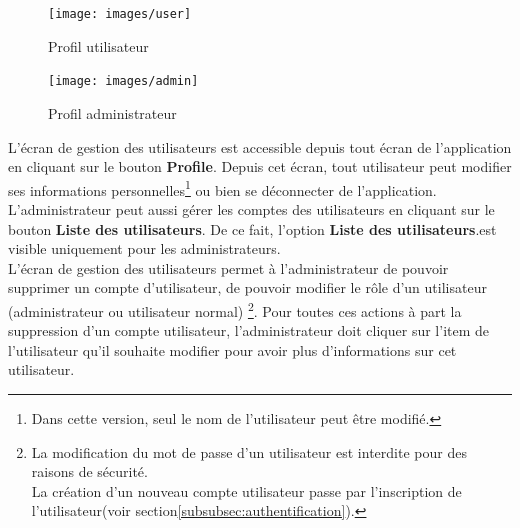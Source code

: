 \documentclass[12pt]{article}
\begin{document}
        \vspace{0.5cm}
        \begin{minipage}[t]{0.45\textwidth}
            \centering
            \begin{figure}[H]
                \centering
                \texttt{[image: images/user]}
                \caption{Profil utilisateur}
                \label{fig:gestion-utilisateurs-normal}
            \end{figure}
        \end{minipage}
        \hspace{0.5cm}
        \begin{minipage}[t]{0.45\textwidth}
            \centering
            \begin{figure}[H]
                \centering
                \texttt{[image: images/admin]}
                \caption{Profil administrateur}
                \label{fig:gestion-utilisateurs-admin}
            \end{figure}
        \end{minipage}
        \vspace{0.5cm}

        L'écran de gestion des utilisateurs est accessible depuis tout écran de l'application en cliquant sur le bouton \textbf{Profile}.
        Depuis cet écran, tout utilisateur peut modifier ses informations personnelles\footnote{Dans cette version, seul le nom de l'utilisateur peut être modifié.} ou bien se déconnecter de l'application.
        L'administrateur peut aussi gérer les comptes des utilisateurs en cliquant sur le bouton \textbf{Liste des utilisateurs}. De ce fait, l'option
        \textbf{Liste des utilisateurs}.est visible uniquement pour les administrateurs.\\
        L'écran de gestion des utilisateurs permet à l'administrateur de pouvoir supprimer un compte d'utilisateur,
        de pouvoir modifier le rôle d'un utilisateur (administrateur ou utilisateur normal) \footnote{La modification du mot de passe d'un utilisateur est interdite pour des raisons de sécurité.\\
        La création d'un nouveau compte utilisateur passe par l'inscription de l'utilisateur(voir section\ref{subsubsec:authentification}).}.
        Pour toutes ces actions à part la suppression d'un compte utilisateur, l'administrateur doit cliquer sur l'item de l'utilisateur
        qu'il souhaite modifier pour avoir plus d'informations sur cet utilisateur.\\
\end{document}
